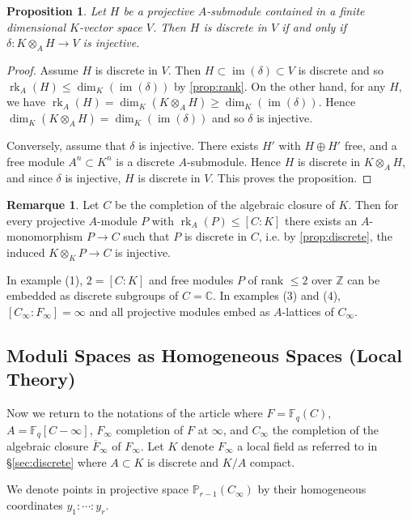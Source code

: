 \documentclass[12pt,a4paper]{article}
\theoremstyle{plain}
\newtheorem{proposition}{Proposition}[section]
\theoremstyle{definition}
\newtheorem{remark}{Remarque}[section]
\theoremstyle{remark}
\DeclareMathOperator{\im}{im}
\newcommand{\bF}{\mathbb{F}}
\newcommand{\bC}{\mathbb{C}}
\newcommand{\bZ}{\mathbb{Z}}
\newcommand{\bP}{\mathbb{P}}
\providecommand{\rk}{\operatorname{rk}}
\begin{document}
\begin{proposition}
\label{prop:discrete}
Let $H$ be a projective $A$-submodule contained in a finite dimensional $K$-vector space $V$. Then $H$ is discrete in $V$ if and only if $\delta: K \otimes_A H \to V$ is injective.
\end{proposition}

\begin{proof}
Assume $H$ is discrete in $V$. Then $H \subset \im(\delta) \subset V$ is discrete and so $\rk_A(H) \leq \dim_K(\im(\delta))$ by \eqref{prop:rank}. On the other hand, for any $H$, we have $\rk_A(H) = \dim_K(K \otimes_A H) \geq \dim_K(\im(\delta))$. Hence $\dim_K(K \otimes_A H) = \dim_K(\im(\delta))$ and so $\delta$ is injective.

Conversely, assume that $\delta$ is injective. There exists $H'$ with $H \oplus H'$ free, and a free module $A^n \subset K^n$ is a discrete $A$-submodule. Hence $H$ is discrete in $K \otimes_A H$, and since $\delta$ is injective, $H$ is discrete in $V$. This proves the proposition.
\end{proof}

\begin{remark}
\label{rem:embedding}
Let $C$ be the completion of the algebraic closure of $K$. Then for every projective $A$-module $P$ with $\rk_A(P) \leq [C : K]$ there exists an $A$-monomorphism $P \to C$ such that $P$ is discrete in $C$, i.e. by \eqref{prop:discrete}, the induced $K \otimes_K P \to C$ is injective.

In example (1), $2 = [C : K]$ and free modules $P$ of rank $\leq 2$ over $\bZ$ can be embedded as discrete subgroups of $C = \bC$. In examples (3) and (4), $[C_\infty : F_\infty] = \infty$ and all projective modules embed as $A$-lattices of $C_\infty$.
\end{remark}

\subsection{Moduli Spaces as Homogeneous Spaces (Local Theory)}
\label{sec:local}

Now we return to the notations of the article where $F = \bF_q(C)$, $A = \bF_q[C - \infty]$, $F_\infty$ completion of $F$ at $\infty$, and $C_\infty$ the completion of the algebraic closure $\overline{F}_\infty$ of $F_\infty$. Let $K$ denote $F_\infty$ a local field as referred to in \S\ref{sec:discrete} where $A \subset K$ is discrete and $K/A$ compact.

We denote points in projective space $\bP_{r-1}(C_\infty)$ by their homogeneous coordinates $y_1 : \cdots : y_r$.
\end{document}
